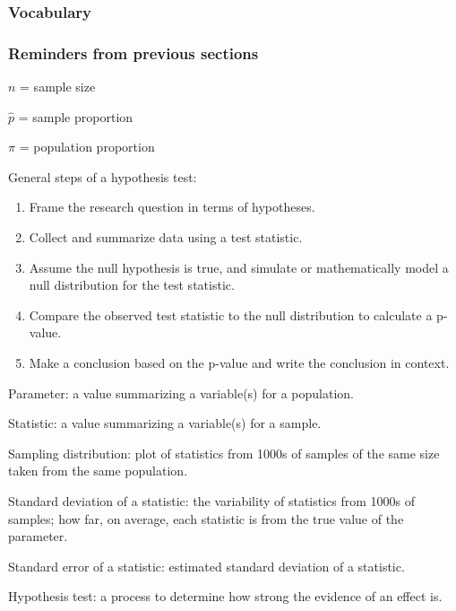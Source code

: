 \documentclass[
]{report}
\begin{document}

\hypertarget{vocabulary-13}{%
\subsubsection*{Vocabulary}\label{vocabulary-13}}

\hypertarget{reminders-from-previous-sections-5}{%
\subsubsection*{Reminders from previous sections}\label{reminders-from-previous-sections-5}}

\(n\) = sample size

\(\hat{p}\) = sample proportion

\(\pi\) = population proportion

General steps of a hypothesis test:

\begin{enumerate}
\def\labelenumi{\arabic{enumi}.}
\item
  Frame the research question in terms of hypotheses.
\item
  Collect and summarize data using a test statistic.
\item
  Assume the null hypothesis is true, and simulate or mathematically model a null distribution for the test statistic.
\item
  Compare the observed test statistic to the null distribution to calculate a p-value.
\item
  Make a conclusion based on the p-value and write the conclusion in context.
\end{enumerate}

Parameter: a value summarizing a variable(s) for a population.

Statistic: a value summarizing a variable(s) for a sample.

Sampling distribution: plot of statistics from 1000s of samples of the same size taken from the same population.

Standard deviation of a statistic: the variability of statistics from 1000s of samples; how far, on average, each statistic is from the true value of the parameter.

Standard error of a statistic: estimated standard deviation of a statistic.

Hypothesis test: a process to determine how strong the evidence of an effect is.
\end{document}

